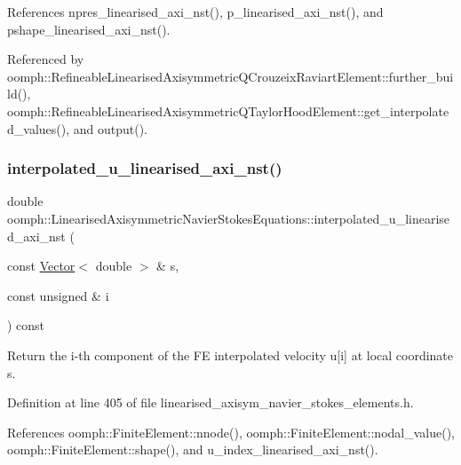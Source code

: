 References npres\+\_\+linearised\+\_\+axi\+\_\+nst(), p\+\_\+linearised\+\_\+axi\+\_\+nst(), and pshape\+\_\+linearised\+\_\+axi\+\_\+nst().



Referenced by oomph\+::\+Refineable\+Linearised\+Axisymmetric\+Q\+Crouzeix\+Raviart\+Element\+::further\+\_\+build(), oomph\+::\+Refineable\+Linearised\+Axisymmetric\+Q\+Taylor\+Hood\+Element\+::get\+\_\+interpolated\+\_\+values(), and output().

\mbox{\label{classoomph_1_1LinearisedAxisymmetricNavierStokesEquations_a8dc5571fe4c2c82e1e2c005fc25b65e6}} 
\subsubsection{\texorpdfstring{interpolated\+\_\+u\+\_\+linearised\+\_\+axi\+\_\+nst()}{interpolated\_u\_linearised\_axi\_nst()}}
{\footnotesize\ttfamily double oomph\+::\+Linearised\+Axisymmetric\+Navier\+Stokes\+Equations\+::interpolated\+\_\+u\+\_\+linearised\+\_\+axi\+\_\+nst (\begin{DoxyParamCaption}\item[{const \hyperlink{classoomph_1_1Vector}{Vector}$<$ double $>$ \&}]{s,  }\item[{const unsigned \&}]{i }\end{DoxyParamCaption}) const\hspace{0.3cm}{\ttfamily [inline]}}



Return the i-\/th component of the FE interpolated velocity u\mbox{[}i\mbox{]} at local coordinate s. 



Definition at line 405 of file linearised\+\_\+axisym\+\_\+navier\+\_\+stokes\+\_\+elements.\+h.



References oomph\+::\+Finite\+Element\+::nnode(), oomph\+::\+Finite\+Element\+::nodal\+\_\+value(), oomph\+::\+Finite\+Element\+::shape(), and u\+\_\+index\+\_\+linearised\+\_\+axi\+\_\+nst().



